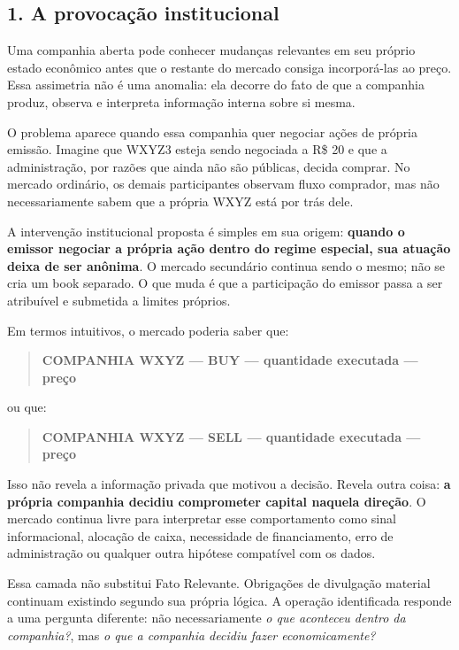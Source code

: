 \documentclass[
  a4paper,
]{article}
\begin{document}
\hypertarget{1-a-provocacao-institucional}{}

\hypertarget{1-a-provocauxe7uxe3o-institucional}{%
\subsection{1. A provocação
institucional}\label{1-a-provocauxe7uxe3o-institucional}}

Uma companhia aberta pode conhecer mudanças relevantes em seu próprio
estado econômico antes que o restante do mercado consiga incorporá-las
ao preço. Essa assimetria não é uma anomalia: ela decorre do fato de que
a companhia produz, observa e interpreta informação interna sobre si
mesma.

O problema aparece quando essa companhia quer negociar ações de própria
emissão. Imagine que WXYZ3 esteja sendo negociada a R\$ 20 e que a
administração, por razões que ainda não são públicas, decida comprar. No
mercado ordinário, os demais participantes observam fluxo comprador, mas
não necessariamente sabem que a própria WXYZ está por trás dele.

A intervenção institucional proposta é simples em sua origem:
\textbf{quando o emissor negociar a própria ação dentro do regime
especial, sua atuação deixa de ser anônima}. O mercado secundário
continua sendo o mesmo; não se cria um book separado. O que muda é que a
participação do emissor passa a ser atribuível e submetida a limites
próprios.

Em termos intuitivos, o mercado poderia saber que:

\begin{quote}
\textbf{COMPANHIA WXYZ --- BUY --- quantidade executada --- preço}
\end{quote}

ou que:

\begin{quote}
\textbf{COMPANHIA WXYZ --- SELL --- quantidade executada --- preço}
\end{quote}

Isso não revela a informação privada que motivou a decisão. Revela outra
coisa: \textbf{a própria companhia decidiu comprometer capital naquela
direção}. O mercado continua livre para interpretar esse comportamento
como sinal informacional, alocação de caixa, necessidade de
financiamento, erro de administração ou qualquer outra hipótese
compatível com os dados.

Essa camada não substitui Fato Relevante. Obrigações de divulgação
material continuam existindo segundo sua própria lógica. A operação
identificada responde a uma pergunta diferente: não necessariamente
\emph{o que aconteceu dentro da companhia?}, mas \emph{o que a companhia
decidiu fazer economicamente?}
\end{document}
